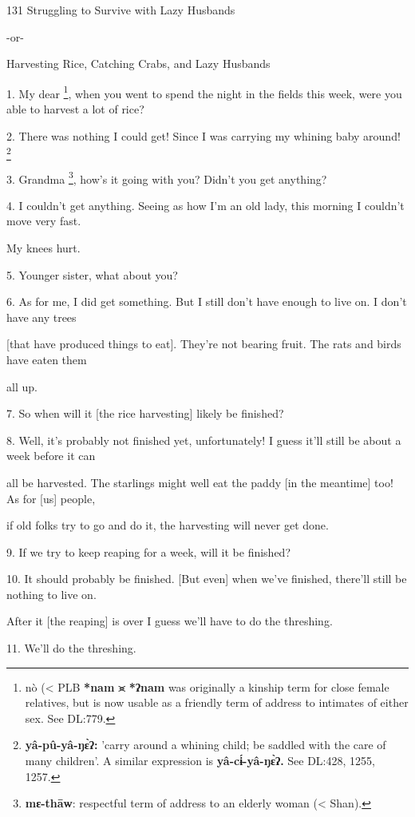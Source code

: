 
131 Struggling to Survive with Lazy Husbands

-or-

Harvesting Rice, Catching Crabs, and Lazy Husbands

1. My dear \footnote{nò (< PLB \textbf{*nam }⪤\textbf{ *ʔnam} was originally a kinship term for close female relatives, but is now  usable as a friendly term of address to intimates of either sex. See DL:779.}, when you went to spend the night in the fields this week, were
you able to harvest a lot of rice?

2. There was nothing I could get! Since I was carrying my whining baby around! \footnote{\textbf{yâ-pû-yâ-ŋɛ̀ʔ:} 'carry around a whining child; be saddled with the care of many children'. A similar expression is \textbf{yâ-cɨ́-yâ-ŋɛ̀ʔ.} See DL:428, 1255, 1257.}

3. Grandma \footnote{\textbf{mɛ-thāw}: respectful term of address to an elderly woman (< Shan).}, how's it going with you? Didn't you get anything?

4. I couldn't get anything. Seeing as how I'm an old lady, this morning I couldn't
move very fast.

My knees hurt.

5. Younger sister, what about you?

6. As for me, I did get something. But I still don't have enough to live on.  I
don't have any trees

[that have produced things to eat]. They're not bearing fruit. The rats and birds
have eaten them

all  up.

7. So when will it [the rice harvesting] likely be finished?

8. Well, it's probably not finished yet, unfortunately! I guess it'll still be
about a week before it can

all be harvested. The starlings might well eat the paddy [in the meantime] too!
As for [us] people,

if old folks try to go and do it, the harvesting will never get done.

9. If we try to keep reaping for a week, will it be finished?

10. It should probably be finished. [But even] when we've finished, there'll still
be nothing to live on.

After it [the reaping] is over I guess we'll have to do the threshing.

11. We'll do the threshing.

